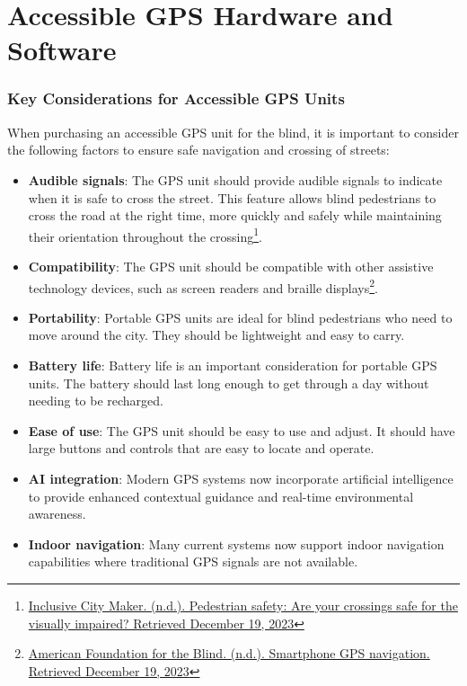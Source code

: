 \section{Accessible GPS Hardware and Software}\label{sec:accessible-gps-hardware}
\subsubsection{Key Considerations for Accessible GPS Units}

When purchasing an accessible GPS unit for the blind, it is important to consider the following factors to ensure safe navigation and crossing of streets:

\begin{itemize}

 \item \textbf{Audible signals}: The GPS unit should provide audible signals to indicate when it is safe to cross the street. This feature allows blind pedestrians to cross the road at the right time, more quickly and safely while maintaining their orientation throughout the crossing\footnote{\href{http://www.inclusivecitymaker.com/pedestrian-safety-visually-impaired-blind-people/}{Inclusive City Maker. (n.d.). Pedestrian safety: Are your crossings safe for the visually impaired? Retrieved December 19, 2023}}.
 \item \textbf{Compatibility}: The GPS unit should be compatible with other assistive technology devices, such as screen readers and braille displays\footnote{\href{http://www.afb.org/blindness-and-low-vision/using-technology/smartphone-gps-navigation-people-visual-impairments}{American Foundation for the Blind. (n.d.). Smartphone GPS navigation. Retrieved December 19, 2023}}.
 \item \textbf{Portability}: Portable GPS units are ideal for blind pedestrians who need to move around the city. They should be lightweight and easy to carry.
 \item \textbf{Battery life}: Battery life is an important consideration for portable GPS units. The battery should last long enough to get through a day without needing to be recharged.
 \item \textbf{Ease of use}: The GPS unit should be easy to use and adjust. It should have large buttons and controls that are easy to locate and operate.
 \item \textbf{AI integration}: Modern GPS systems now incorporate artificial intelligence to provide enhanced contextual guidance and real-time environmental awareness.
 \item \textbf{Indoor navigation}: Many current systems now support indoor navigation capabilities where traditional GPS signals are not available.

\end{itemize}

